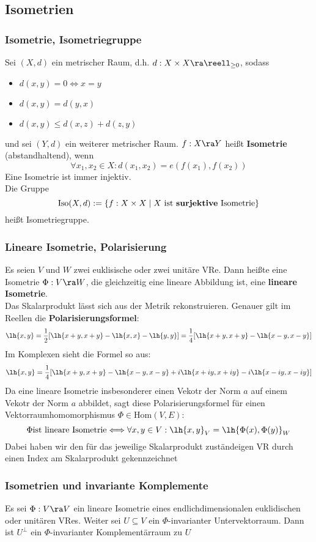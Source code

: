 \documentclass{kit}
\begin{document}
  \subsection{Isometrien}
    \subsubsection{Isometrie, Isometriegruppe}
      Sei $(X,d)$ ein metrischer Raum, d.h. $d:X\times X\ra\reell_{\ge0}$, sodass
      \begin{itemize}
        \item $d(x,y)=0\Leftrightarrow x=y$
        \item $d(x,y)=d(y,x)$
        \item $d(x,y)\le d(x,z)+d(z,y)$
      \end{itemize}
      und sei $(Y,d)$ ein weiterer metrischer Raum. $f:X\ra Y$ heißt \textbf{Isometrie} (abstandhaltend), wenn
      $$\forall x_1,x_2\in X:d(x_1,x_2)=e(f(x_1),f(x_2))$$
      Eine Isometrie ist immer injektiv.\\
      Die Gruppe
      $$\text{Iso}(X,d):=\{f:X\times X\mid X\text{ ist \textbf{surjektive} Isometrie}\}$$
      heißt Isometriegruppe.
    \subsubsection{Lineare Isometrie, Polarisierung}
      Es seien $V$ und $W$ zwei euklisische oder zwei unitäre VRe. Dann heißte eine Isometrie $\Phi:V\ra W$, die 
      gleichzeitig eine lineare Abbildung ist, eine \textbf{lineare Isometrie}.\\
      Das Skalarprodukt lässt sich aus der Metrik rekonstruieren. Genauer gilt im Reellen die \textbf{Polarisierungsformel}:
      $$\lh{x,y}=\frac{1}{2}[\lh{x+y,x+y}-\lh{x,x}-\lh{y,y}]=\frac{1}{4}[\lh{x+y,x+y}-\lh{x-y,x-y}]$$
      Im Komplexen sieht die Formel so aus:
      $$\lh{x,y}=\frac{1}{4}[\lh{x+y,x+y}-\lh{x-y,x-y}+i\lh{x+iy,x+iy}-i\lh{x-iy,x-iy}]$$
      Da eine lineare Isometrie insbesonderer einen Vekotr der Norm $a$ auf einem Vekotr der Norm $a$ abbildet, sagt diese
      Polarisierungsformel für einen Vektorraumhomomorphismus $\Phi\in\text{Hom}(V,E)$:
      $$\Phi\text{ist lineare Isometrie}\Longleftrightarrow\forall x,y\in V:\lh{x,y}_V=\lh{\Phi(x),\Phi(y)}_W$$
      Dabei haben wir den für das jeweilige Skalarprodukt zuständeigen VR durch einen Index am Skalarprodukt gekennzeichnet
    \subsubsection{Isometrien und invariante Komplemente}
      Es sei $\Phi:V\ra V$ ein lineare Isometrie eines endlichdimensionalen euklidischen oder unitären VRes. Weiter sei
      $U\subseteq V$ ein $\Phi$-invarianter Untervektorraum. Dann ist $U^\perp$ ein $\Phi$-invarianter 
      Komplementärraum zu $U$
\end{document}
